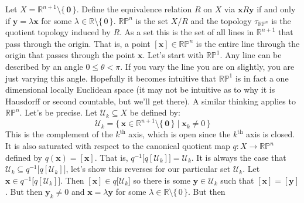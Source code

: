\documentclass{article}
\theoremstyle{plain}
\theoremstyle{normal}
\newenvironment{example}{%
    \pushQED{\qed}\renewcommand{\qedsymbol}{$\blacksquare$}\examplex%
}{%
    \popQED\endexamplex%
}
\begin{document}
       \begin{example}[\textbf{Real Projective Space}]
            Let $X=\mathbb{R}^{n+1}\setminus\{\,\mathbf{0}\,\}$. Define the
            equivalence relation $R$ on $X$ via $\mathbf{x}R\mathbf{y}$ if and
            only if $\mathbf{y}=\lambda\mathbf{x}$ for some
            $\lambda\in\mathbb{R}\setminus\{\,0\,\}$. $\mathbb{RP}^{n}$ is the
            set $X/R$ and the topology $\tau_{\mathbb{RP}^{n}}$ is the
            quotient topology induced by $R$. As a set this is the set of all
            lines in $\mathbb{R}^{n+1}$ that pass through the origin. That is,
            a point $[\mathbf{x}]\in\mathbb{RP}^{n}$ is the entire line through
            the origin that passes through the point $\mathbf{x}$. Let's start
            with $\mathbb{RP}^{1}$. Any line can be described by an angle
            $0\leq\theta<\pi$. If you vary the line you are on slightly, you
            are just varying this angle. Hopefully it becomes intuitive that
            $\mathbb{RP}^{1}$ is in fact a one dimensional locally Euclidean
            space (it may not be intuitive as to why it is Hausdorff or
            second countable, but we'll get there). A similar thinking applies
            to $\mathbb{RP}^{n}$. Let's be precise. Let
            $\mathcal{U}_{k}\subseteq{X}$ be defined by:
            \begin{equation}
                \mathcal{U}_{k}
                =\{\,\mathbf{x}\in\mathbb{R}^{n+1}\setminus\{\,\mathbf{0}\,\}\;
                    |\;\mathbf{x}_{k}\ne{0}\,\}
            \end{equation}
            This is the complement of the $k^{\textrm{th}}$ axis, which is open
            since the $k^{\textrm{th}}$ axis is closed. It is also saturated
            with respect to the canonical quotient map
            $q:X\rightarrow\mathbb{RP}^{n}$ defined by
            $q(\mathbf{x})=[\mathbf{x}]$. That is,
            $q^{-1}\big[q[\mathcal{U}_{k}]\big]=\mathcal{U}_{k}$. It is always
            the case that
            $\mathcal{U}_{k}\subseteq{q}^{-1}\big[q[\mathcal{U}_{k}]\big]$,
            let's show this reverses for our particular set $\mathcal{U}_{k}$.
            Let $\mathbf{x}\in{q}^{-1}\big[q[\mathcal{U}_{k}]\big]$. Then
            $[\mathbf{x}]\in{q}\big[\mathcal{U}_{k}\big]$ so there is some
            $\mathbf{y}\in\mathcal{U}_{k}$ such that
            $[\mathbf{x}]=[\mathbf{y}]$. But then
            $\mathbf{y}_{k}\ne{0}$ and $\mathbf{x}=\lambda\mathbf{y}$ for some
            $\lambda\in\mathbb{R}\setminus\{\,0\,\}$. But then

\end{example}
\end{document}
